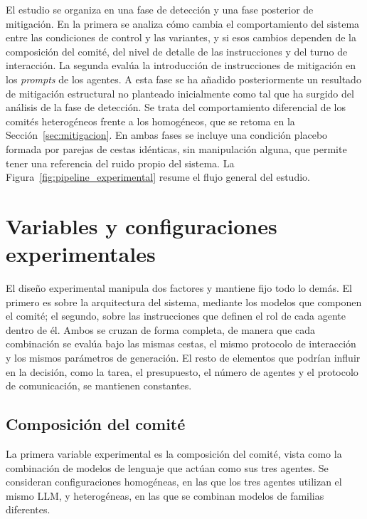 El estudio se organiza en una fase de detección y una fase posterior de mitigación. En la primera se analiza cómo cambia el comportamiento del sistema entre las condiciones de control y las variantes, y si esos cambios dependen de la composición del comité, del nivel de detalle de las instrucciones y del turno de interacción. La segunda evalúa la introducción de instrucciones de mitigación en los \textit{prompts} de los agentes. A esta fase se ha añadido posteriormente un resultado de mitigación estructural no planteado inicialmente como tal que ha surgido del análisis de la fase de detección. Se trata del comportamiento diferencial de los comités heterogéneos frente a los homogéneos, que se retoma en la Sección~\ref{sec:mitigacion}. En ambas fases se incluye una condición placebo formada por parejas de cestas idénticas, sin manipulación alguna, que permite tener una referencia del ruido propio del sistema. La Figura~\ref{fig:pipeline_experimental} resume el flujo general del estudio.



\FloatBarrier

\section{Variables y configuraciones experimentales}
\label{sec:variables_ablacion}

El diseño experimental manipula dos factores y mantiene fijo todo lo demás. El primero es sobre la arquitectura del sistema, mediante los modelos que componen el comité; el segundo, sobre las instrucciones que definen el rol de cada agente dentro de él. Ambos se cruzan de forma completa, de manera que cada combinación se evalúa bajo las mismas cestas, el mismo protocolo de interacción y los mismos parámetros de generación. El resto de elementos que podrían influir en la decisión, como la tarea, el presupuesto, el número de agentes y el protocolo de comunicación, se mantienen constantes.

\subsection{Composición del comité}
\label{subsec:composicion}

La primera variable experimental es la composición del comité, vista como la combinación de modelos de lenguaje que actúan como sus tres agentes. Se consideran configuraciones homogéneas, en las que los tres agentes utilizan el mismo LLM, y heterogéneas, en las que se combinan modelos de familias diferentes.

